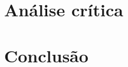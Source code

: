 \documentclass{iiufrgs}
\begin{document}
\chapter{Análise crítica}\label{analise} %


\chapter{Conclusão}\label{conclusao} %













\end{document}
